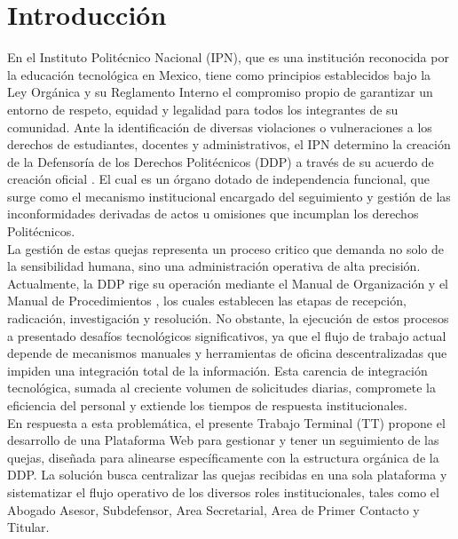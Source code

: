 \documentclass[12pt, letterpaper]{article}
\begin{document}
\newpage
\tableofcontents %
\newpage

\section{Introducción}
En el Instituto Politécnico Nacional (IPN), que es una institución reconocida por la educación tecnológica en Mexico, tiene como principios establecidos bajo la Ley Orgánica \cite{ipn_ley_organica} y su Reglamento Interno \cite{ipn_reglamento_interno} el compromiso propio de garantizar un entorno de respeto, equidad y legalidad para todos los integrantes de su comunidad. Ante la identificación de diversas violaciones o vulneraciones a los derechos de estudiantes, docentes y administrativos, el IPN determino la creación de la Defensoría de los Derechos Politécnicos (DDP) a través de su acuerdo de creación oficial \cite{ipn_acuerdo_ddp}. El cual es un órgano dotado de independencia funcional, que surge como el mecanismo institucional encargado del seguimiento y gestión de las inconformidades derivadas de actos u omisiones que incumplan los derechos Politécnicos.
\\
La gestión de estas quejas representa un proceso critico que demanda no solo de la sensibilidad humana, sino una administración operativa de alta precisión. Actualmente, la DDP rige su operación mediante el Manual de Organización \cite{ipn_manual_organizacion} y el Manual de Procedimientos \cite{ipn_manual_procedimientos}, los cuales establecen las etapas de recepción, radicación, investigación y resolución. No obstante, la ejecución de estos procesos a presentado desafíos tecnológicos significativos, ya que el flujo de trabajo actual depende de mecanismos manuales y herramientas de oficina descentralizadas que impiden una integración total de la información. Esta carencia de integración tecnológica, sumada al creciente volumen de solicitudes diarias, compromete la eficiencia del personal y extiende los tiempos de respuesta institucionales.
\\
En respuesta a esta problemática, el presente Trabajo Terminal (TT) propone el desarrollo de una Plataforma Web para gestionar y tener un seguimiento de las quejas, diseñada para alinearse específicamente con la estructura orgánica de la DDP. La solución busca centralizar las quejas recibidas en una sola plataforma y sistematizar el flujo operativo de los diversos roles institucionales, tales como el Abogado Asesor, Subdefensor, Area Secretarial, Area de Primer Contacto y Titular.
\end{document}
